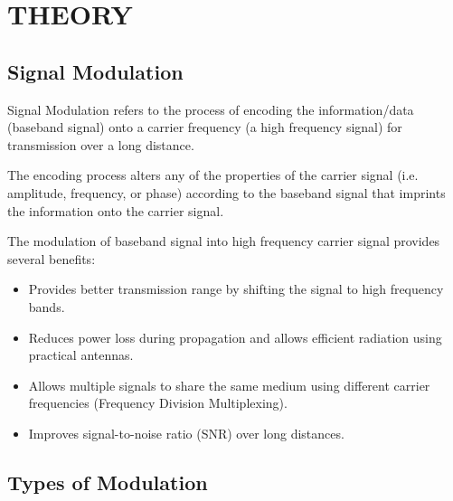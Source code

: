 
\section*{THEORY}

\subsection*{Signal Modulation}
{}

Signal Modulation refers to the process of encoding the information/data (baseband signal)
onto a carrier frequency (a high frequency signal) for transmission over a long distance.

The encoding process alters any of the properties of the carrier signal (i.e. amplitude, frequency, or phase) according to the baseband signal that imprints the information onto the carrier signal.

The modulation of baseband signal into high frequency carrier signal provides several benefits:
\begin{itemize}[itemsep=2pt]
    \item Provides better transmission range by shifting the signal to high frequency bands.
    \item Reduces power loss during propagation and allows efficient radiation using practical antennas.
    \item Allows multiple signals to share the same medium using different carrier frequencies (Frequency Division Multiplexing).
    \item Improves signal-to-noise ratio (SNR) over long distances.
\end{itemize}

\subsection*{Types of Modulation}

